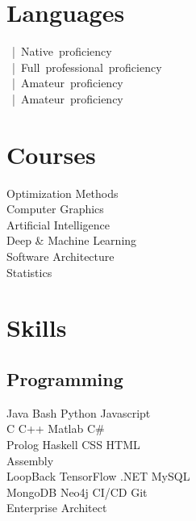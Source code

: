 \documentclass[]{resume}
\begin{document}
\begin{minipage}[t]{0.33\textwidth}

\section{Languages}
\mbox{ | Native proficiency} \\
\mbox{ | Full professional proficiency} \\
\mbox{ | Amateur proficiency} \\
\mbox{ | Amateur proficiency} \\
\sectionsep


\section{Courses}
Optimization Methods \\
Computer Graphics \\
Artificial Intelligence \\
Deep {\lserif\&} Machine Learning \\
Software Architecture \\
Statistics \\
\sectionsep


\section{Skills}
\subsection{Programming}
Java \textbullet{} Bash \textbullet{} Python \textbullet{} Javascript \\
C \textbullet{} C++ \textbullet{} Matlab \textbullet{} C{\lserif\#} \\ 
Prolog \textbullet{} Haskell \textbullet{} CSS \textbullet{} HTML \\
Assembly \\
LoopBack \textbullet{} TensorFlow \textbullet{} .NET \textbullet{} MySQL \\
MongoDB \textbullet{} Neo4j \textbullet{} CI/CD \textbullet{} Git \\
Enterprise Architect
\sectionsep

%
%

\end{minipage} 
\end{document}
